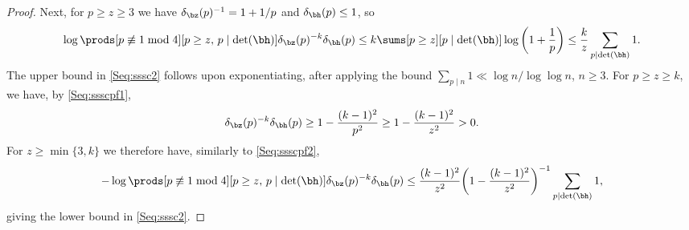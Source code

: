 \documentclass[12pt, reqno, twoside, letterpaper]{amsart}
\begin{document}
\begin{nixnix}
\begin{proof}
Next, for $p \ge z \ge 3$ we have $\delta_{\bz}(p)^{-1} = 1 + 1/p$ 
and $\delta_{\bh}(p) \le 1$, so 
\[
  \log \prods[p \not\equiv 1 \bmod 4][p \ge z, \, p \mid \det(\bh)] 
   \delta_{\bz}(p)^{-k}\delta_{\bh}(p) 
    \le 
     k
      \sums[p \ge z][p \mid \det(\bh)] \log\bigg(1 + \frac{1}{p}\bigg)
       \le
        \frac{k}{z}
         \sum_{p \mid \det(\bh)} 1. 
\]
%
The upper bound in \eqref{Seq:sssc2} follows upon exponentiating, 
after applying the bound 
$\sum_{p \mid n} 1 \ll \log n/\log\log n$, $n \ge 3$.
%
For $p \ge z \ge k$, we have, by \eqref{Seq:ssscpf1},  
\[
  \delta_{\bz}(p)^{-k}\delta_{\bh}(p) 
   \ge 1 - \frac{(k - 1)^2}{p^2}
    \ge 1 - \frac{(k - 1)^2}{z^2} 
    > 0.
\]
%
For $z \ge \min\{3,k\}$ we therefore have, similarly to 
\eqref{Seq:ssscpf2}, 
\[
 -\log \prods[p \not\equiv 1 \bmod 4][p \ge z, \, p \mid \det(\bh)]
   \delta_{\bz}(p)^{-k}\delta_{\bh}(p) 
    \le 
     \frac{(k - 1)^2}{z^2}
      \bigg(1 - \frac{(k - 1)^2}{z^2}\bigg)^{-1}
       \sum_{p \mid \det(\bh)} 1,
\]
giving the lower bound in \eqref{Seq:sssc2}.
\end{proof}
%
\end{nixnix}

\end{document}

